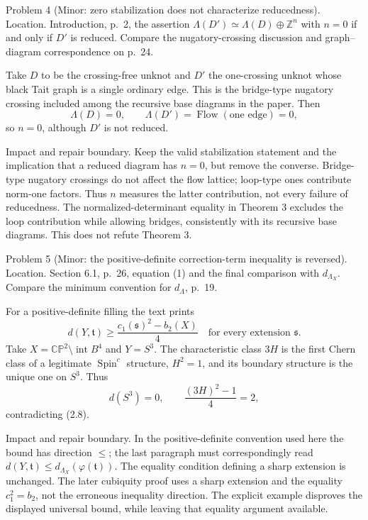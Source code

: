 \documentclass[10pt]{article}
\begin{document}
Problem 4 (Minor: zero stabilization does not characterize reducedness).  Location. Introduction, p. 2, the assertion \(\Lambda(D')\simeq\Lambda(D)\oplus\mathbb Z^n\) with \(n=0\) if and only if \(D'\) is reduced. Compare the nugatory-crossing discussion and graph–diagram correspondence on p. 24.\par
Take \(D\) to be the crossing-free unknot and \(D'\) the one-crossing unknot whose black Tait graph is a single ordinary edge. This is the bridge-type nugatory crossing included among the recursive base diagrams in the paper. Then \[\Lambda(D)=0,\qquad \Lambda(D')=\operatorname{Flow}(\text{one edge})=0,
 \tag{2.7}\] so \(n=0\), although \(D'\) is not reduced.\par
Impact and repair boundary. Keep the valid stabilization statement and the implication that a reduced diagram has \(n=0\), but remove the converse. Bridge-type nugatory crossings do not affect the flow lattice; loop-type ones contribute norm-one factors. Thus \(n\) measures the latter contribution, not every failure of reducedness. The normalized-determinant equality in Theorem 3 excludes the loop contribution while allowing bridges, consistently with its recursive base diagrams. This does not refute Theorem 3.\par
Problem 5 (Minor: the positive-definite correction-term inequality is reversed).  Location. Section 6.1, p. 26, equation (1) and the final comparison with \(d_{\Lambda_X}\). Compare the minimum convention for \(d_\Lambda\), p. 19.\par
For a positive-definite filling the text prints \[d(Y,\mathfrak t)\ge\frac{c_1(\mathfrak s)^2-b_2(X)}4
 \quad\text{for every extension }\mathfrak s.      \tag{2.8}\] Take \(X=\mathbb{CP}^2\setminus\operatorname{int}B^4\) and \(Y=S^3\). The characteristic class \(3H\) is the first Chern class of a legitimate \(\operatorname{Spin}^c\) structure, \(H^2=1\), and its boundary structure is the unique one on \(S^3\). Thus \[d(S^3)=0,\qquad \frac{(3H)^2-1}{4}=2,             \tag{2.9}\] contradicting (2.8).\par
Impact and repair boundary. In the positive-definite convention used here the bound has direction \(\le\); the last paragraph must correspondingly read \(d(Y,\mathfrak t)\le d_{\Lambda_X}(\varphi(\mathfrak t))\). The equality condition defining a sharp extension is unchanged. The later cubiquity proof uses a sharp extension and the equality \(c_1^2=b_2\), not the erroneous inequality direction. The explicit example disproves the displayed universal bound, while leaving that equality argument available.\par
\end{document}
